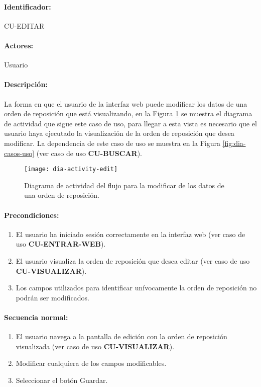 \paragraph{Identificador:}
CU-EDITAR
\paragraph{Actores:}
Usuario
\paragraph{Descripción:}
La forma en que el usuario de la interfaz web puede modificar los datos de una orden de reposición que está visualizando, en la Figura \ref{fig:dia-activity-edit} se muestra el diagrama de actividad que sigue este caso de uso, para llegar a esta vista es necesario que el usuario haya ejecutado la visualización de la orden de reposición que desea modificar. La dependencia de este caso de uso se muestra en la Figura \ref{fig:dia-casos-uso} (ver caso de uso \textbf{CU-BUSCAR}).
\begin{figure}[h]
  \centering
  \texttt{[image: dia-activity-edit]}
  \caption{Diagrama de actividad del flujo para la modificar de los datos de una orden de reposición.}
  \label{fig:dia-activity-edit}
\end{figure}
\paragraph{Precondiciones:}
\begin{enumerate}
  \item El usuario ha iniciado sesión correctamente en la interfaz web (ver caso de uso \textbf{CU-ENTRAR-WEB}).
  \item El usuario visualiza la orden de reposición que desea editar (ver caso de uso \textbf{CU-VISUALIZAR}).
  \item Los campos utilizados para identificar unívocamente la orden de reposición no podrán ser modificados. 
\end{enumerate}
\paragraph{Secuencia normal:}
\begin{enumerate}
  \item El usuario navega a la pantalla de edición con la orden de reposición visualizada (ver caso de uso \textbf{CU-VISUALIZAR}).
  \item Modificar cualquiera de los campos modificables.
  \item Seleccionar el botón Guardar.
\end{enumerate}
